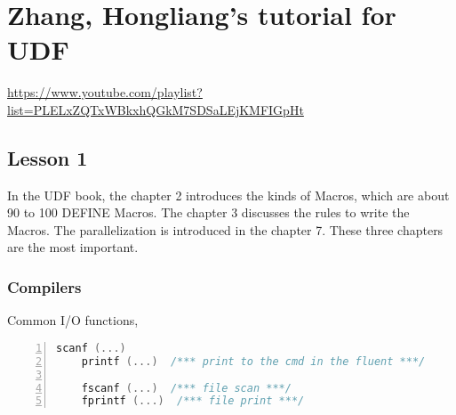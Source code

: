\chapter{Zhang, Hongliang's tutorial for UDF}
\url{https://www.youtube.com/playlist?list=PLELxZQTxWBkxhQGkM7SDSaLEjKMFIGpHt}
\section{Lesson 1}
In the UDF book, the chapter 2 introduces the kinds of Macros, which are about 90 to 100 DEFINE Macros. 
The chapter 3 discusses the rules to write the Macros. 
The parallelization is introduced in the chapter 7. 
These three chapters are the most important.

\subsection{Compilers}
Common I/O functions,
\begin{lstlisting}[basicstyle=\small\ttfamily, numbers=left, language=C]
    scanf (...)
    printf (...)  /*** print to the cmd in the fluent ***/

    fscanf (...)  /*** file scan ***/
    fprintf (...)  /*** file print ***/
\end{lstlisting}
